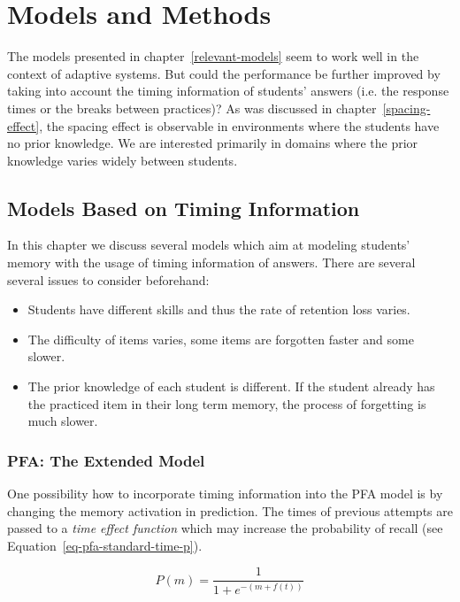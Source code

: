 \chapter{Models and Methods}

The models presented in chapter~\ref{relevant-models} seem to work well in the context of adaptive systems. But could the performance be further improved by taking into account the timing information of students' answers (i.e. the response times or the breaks between practices)? As was discussed in chapter~\ref{spacing-effect}, the spacing effect is observable in environments where the students have no prior knowledge. We are interested primarily in domains where the prior knowledge varies widely between students.

\section{Models Based on Timing Information}

In this chapter we discuss several models which aim at modeling students' memory with the usage of timing information of answers. There are several several issues to consider beforehand:

\begin{itemize}
  \item Students have different skills and thus the rate of retention loss varies.
  \item The difficulty of items varies, some items are forgotten faster and some slower.
  \item The prior knowledge of each student is different. If the student already has the practiced item in their long term memory, the process of forgetting is much slower.
\end{itemize}

\subsection{PFA: The Extended Model}

One possibility how to incorporate timing information into the PFA model is by changing the memory activation in prediction. The times of previous attempts are passed to a \textit{time effect function} which may increase the probability of recall (see Equation~\ref{eq-pfa-standard-time-p}).

\begin{equation} \label{eq-pfa-standard-time-p}
  P(m) = \frac{1}{1 + e^{-(m + f(t))}}
\end{equation}

